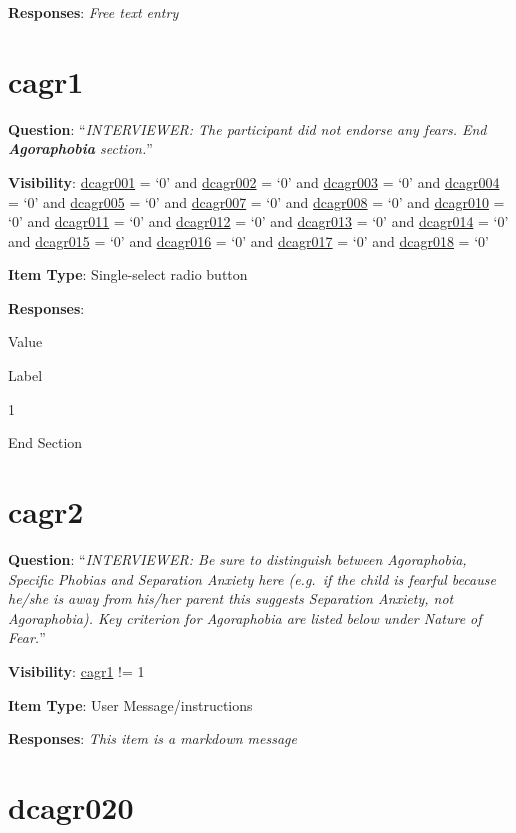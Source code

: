 \documentclass[]{book}
\begin{document}
\textbf{Responses}: \emph{Free text entry}

\hypertarget{cagr1}{%
\section{cagr1}\label{cagr1}}

\textbf{Question}: ``\emph{INTERVIEWER: The participant did not endorse any fears. End \textbf{Agoraphobia} section.}''

\textbf{Visibility}: \protect\hyperlink{dcagr001}{dcagr001} = `0' and \protect\hyperlink{dcagr002}{dcagr002} = `0' and \protect\hyperlink{dcagr003}{dcagr003} = `0' and \protect\hyperlink{dcagr004}{dcagr004} = `0' and \protect\hyperlink{dcagr005}{dcagr005} = `0' and \protect\hyperlink{dcagr007}{dcagr007} = `0' and \protect\hyperlink{dcagr008}{dcagr008} = `0' and \protect\hyperlink{dcagr010}{dcagr010} = `0' and \protect\hyperlink{dcagr011}{dcagr011} = `0' and \protect\hyperlink{dcagr012}{dcagr012} = `0' and \protect\hyperlink{dcagr013}{dcagr013} = `0' and \protect\hyperlink{dcagr014}{dcagr014} = `0' and \protect\hyperlink{dcagr015}{dcagr015} = `0' and \protect\hyperlink{dcagr016}{dcagr016} = `0' and \protect\hyperlink{dcagr017}{dcagr017} = `0' and \protect\hyperlink{dcagr018}{dcagr018} = `0'

\textbf{Item Type}: Single-select radio button

\textbf{Responses}:

Value

Label

1

End Section

\hypertarget{cagr2}{%
\section{cagr2}\label{cagr2}}

\textbf{Question}: ``\emph{INTERVIEWER: Be sure to distinguish between Agoraphobia, Specific Phobias and Separation Anxiety here (e.g.~if the child is fearful because he/she is away from his/her parent this suggests Separation Anxiety, not Agoraphobia). Key criterion for Agoraphobia are listed below under Nature of Fear.}''

\textbf{Visibility}: \protect\hyperlink{cagr1}{cagr1} != 1

\textbf{Item Type}: User Message/instructions

\textbf{Responses}: \emph{This item is a markdown message}

\hypertarget{dcagr020}{%
\section{dcagr020}\label{dcagr020}}
\end{document}
